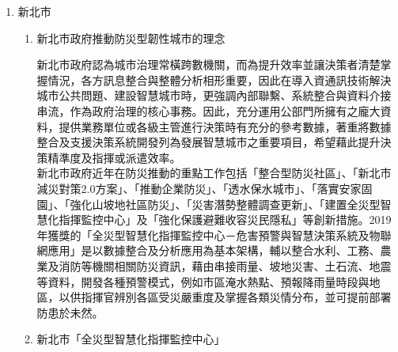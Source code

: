 \documentclass[a4paper,12pt]{article}
\begin{document}
\begin{enumerate}
\item 新北市
\label{sec:orgb77d105}
\begin{enumerate}
\item 新北市政府推動防災型韌性城市的理念
\label{sec:org4d90130}

新北市政府認為城市治理常橫跨數機關，而為提升效率並讓決策者清楚掌握情況，各方訊息整合與整體分析相形重要，因此在導入資通訊技術解決城市公共問題、建設智慧城市時，更強調內部聯繫、系統整合與資料介接串流，作為政府治理的核心事務。因此，充分運用公部門所擁有之龐大資料，提供業務單位或各級主管進行決策時有充分的參考數據，著重將數據整合及支援決策系統開發列為發展智慧城市之重要項目，希望藉此提升決策精準度及指揮或派遣效率。\\

新北市政府近年在防災推動的重點工作包括「整合型防災社區」、「新北市減災對策2.0方案」、「推動企業防災」、「透水保水城市」、「落實安家固園」、「強化山坡地社區防災」、「災害潛勢整體調查更新」、「建置全災型智慧化指揮監控中心」及「強化保護避難收容災民隱私」等創新措施。2019年獲獎的「全災型智慧化指揮監控中心－危害預警與智慧決策系統及物聯網應用」是以數據整合及分析應用為基本架構，輔以整合水利、工務、農業及消防等機關相關防災資訊，藉由串接雨量、坡地災害、土石流、地震等資料，開發各種預警模式，例如市區淹水熱點、預報降雨量時段與地區，以供指揮官辨別各區受災嚴重度及掌握各類災情分布，並可提前部署防患於未然。\\
\item 新北市「全災型智慧化指揮監控中心」
\label{sec:orgb9f1b7c}


\end{enumerate}
\end{enumerate}
\end{document}
